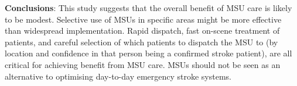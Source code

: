 \textbf{Conclusions}: This study suggests that the overall benefit of MSU care is likely to be modest. Selective use of MSUs in specific areas might be more effective than widespread implementation. Rapid dispatch, fast on-scene treatment of patients, and careful selection of which patients to dispatch the MSU to (by location and confidence in that person being a confirmed stroke patient), are all critical for achieving benefit from MSU care. MSUs should not be seen as an alternative to optimising day-to-day emergency stroke systems.